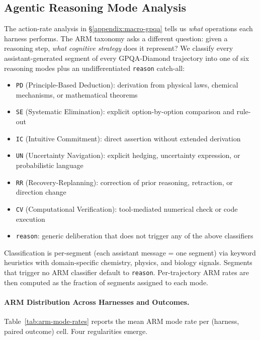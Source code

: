 \subsection{Agentic Reasoning Mode Analysis}
\label{appendix:macro-arm}

The action-rate analysis in \S\ref{appendix:macro-gpqa} tells us \emph{what} operations each harness performs. The ARM taxonomy asks a different question: given a reasoning step, \emph{what cognitive strategy} does it represent? We classify every assistant-generated segment of every GPQA-Diamond trajectory into one of six reasoning modes plus an undifferentiated \texttt{reason} catch-all:

\begin{itemize}[leftmargin=*, itemsep=1pt]
\item \texttt{PD} (Principle-Based Deduction): derivation from physical laws, chemical mechanisms, or mathematical theorems
\item \texttt{SE} (Systematic Elimination): explicit option-by-option comparison and rule-out
\item \texttt{IC} (Intuitive Commitment): direct assertion without extended derivation
\item \texttt{UN} (Uncertainty Navigation): explicit hedging, uncertainty expression, or probabilistic language
\item \texttt{RR} (Recovery-Replanning): correction of prior reasoning, retraction, or direction change
\item \texttt{CV} (Computational Verification): tool-mediated numerical check or code execution
\item \texttt{reason}: generic deliberation that does not trigger any of the above classifiers
\end{itemize}

Classification is per-segment (each assistant message = one segment) via keyword heuristics with domain-specific chemistry, physics, and biology signals. Segments that trigger no ARM classifier default to \texttt{reason}. Per-trajectory ARM rates are then computed as the fraction of segments assigned to each mode.

\paragraph{ARM Distribution Across Harnesses and Outcomes.}
Table~\ref{tab:arm-mode-rates} reports the mean ARM mode rate per (harness, paired outcome) cell. Four regularities emerge.

